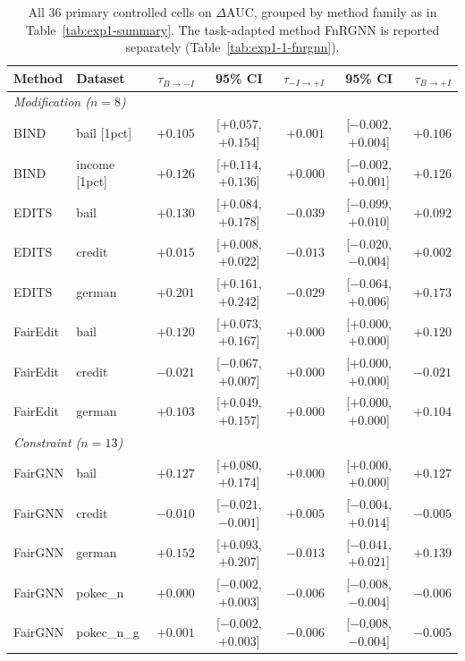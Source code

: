 \begin{table}[t]
\centering
\caption{All 36 primary controlled cells on $\Delta$AUC, grouped by method family as in Table~\ref{tab:exp1-summary}. The task-adapted method FnRGNN is reported separately (Table~\ref{tab:exp1-1-fnrgnn}).}
\label{tab:exp1-cells-dAUC}
\scriptsize
\vspace{-0.2cm}
\begin{tabular}{llrcrcr}
\toprule
Method & Dataset & $\tau_{B\rightarrow -I}$ & 95\% CI & $\tau_{-I\rightarrow +I}$ & 95\% CI & $\tau_{B\rightarrow +I}$ \\
\midrule
\multicolumn{7}{l}{\textit{Modification ($n=8$)}} \\
BIND & bail [1pct] & $+0.105$ & [$+0.057$, $+0.154$] & $+0.001$ & [$-0.002$, $+0.004$] & $+0.106$ \\
BIND & income [1pct] & $+0.126$ & [$+0.114$, $+0.136$] & $+0.000$ & [$-0.002$, $+0.001$] & $+0.126$ \\
\midrule
EDITS & bail & $+0.130$ & [$+0.084$, $+0.178$] & $-0.039$ & [$-0.099$, $+0.010$] & $+0.092$ \\
EDITS & credit & $+0.015$ & [$+0.008$, $+0.022$] & $\mathbf{-0.013}$ & [$-0.020$, $-0.004$] & $+0.002$ \\
EDITS & german & $+0.201$ & [$+0.161$, $+0.242$] & $-0.029$ & [$-0.064$, $+0.006$] & $+0.173$ \\
\midrule
FairEdit & bail & $+0.120$ & [$+0.073$, $+0.167$] & $+0.000$ & [$+0.000$, $+0.000$] & $+0.120$ \\
FairEdit & credit & $-0.021$ & [$-0.067$, $+0.007$] & $+0.000$ & [$+0.000$, $+0.000$] & $-0.021$ \\
FairEdit & german & $+0.103$ & [$+0.049$, $+0.157$] & $+0.000$ & [$+0.000$, $+0.000$] & $+0.104$ \\
\midrule
\multicolumn{7}{l}{\textit{Constraint ($n=13$)}} \\
FairGNN & bail & $+0.127$ & [$+0.080$, $+0.174$] & $+0.000$ & [$+0.000$, $+0.000$] & $+0.127$ \\
FairGNN & credit & $-0.010$ & [$-0.021$, $-0.001$] & $+0.005$ & [$-0.004$, $+0.014$] & $-0.005$ \\
FairGNN & german & $+0.152$ & [$+0.093$, $+0.207$] & $-0.013$ & [$-0.041$, $+0.021$] & $+0.139$ \\
FairGNN & pokec\_n & $+0.000$ & [$-0.002$, $+0.003$] & $-0.006$ & [$-0.008$, $-0.004$] & $-0.006$ \\
FairGNN & pokec\_n\_g & $+0.001$ & [$-0.002$, $+0.003$] & $-0.006$ & [$-0.008$, $-0.004$] & $-0.005$ \\

\end{tabular}
\end{table}
